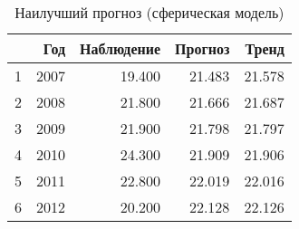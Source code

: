 \begin{table}[ht]
\centering
\begin{tabular}{rrrrr}
  \hline
 & Год & Наблюдение & Прогноз & Тренд \\ 
  \hline
1 & 2007 & 19.400 & 21.483 & 21.578 \\ 
  2 & 2008 & 21.800 & 21.666 & 21.687 \\ 
  3 & 2009 & 21.900 & 21.798 & 21.797 \\ 
  4 & 2010 & 24.300 & 21.909 & 21.906 \\ 
  5 & 2011 & 22.800 & 22.019 & 22.016 \\ 
  6 & 2012 & 20.200 & 22.128 & 22.126 \\ 
   \hline
\end{tabular}
\caption{Наилучший прогноз (сферическая модель)} 
\label{table:manual-best-prediction}
\end{table}
